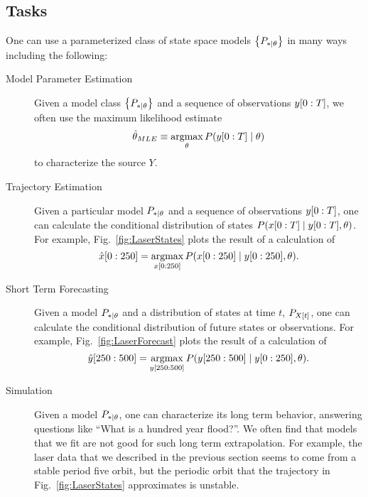 \subsection{Tasks}
\label{sec:tasks}

One can use a parameterized class of state space models $\left\{
  P_{*\mid \theta} \right\}$ in many ways including the following:
\begin{description}
\item[Model Parameter Estimation] Given a model class $\left\{
    P_{*\mid \theta} \right\}$ and a sequence of observations $y[0:T]$,
  we often use the maximum likelihood estimate
  \begin{equation}
    \label{eq:IntroMLE}
    \hat \theta_{MLE} \equiv \operatorname*{argmax}_{\theta} P(y[0:T]\mid \theta)
  \end{equation}
  to characterize the source  $Y$.
\item[Trajectory Estimation] Given a particular model $P_{*\mid \theta}$ and
  a sequence of observations $y[0:T]$, one can calculate the
  conditional distribution of states
  $P(x[0:T]\mid y[0:T],\theta)$.  For example,
  Fig.~\ref{fig:LaserStates} plots the result of a calculation of
  \begin{equation*}
    \hat x[0:250] = \operatorname*{argmax}_{x[0:250]}
    P(x[0:250]\mid y[0:250],\theta).    
  \end{equation*}
\item[Short Term Forecasting] Given a model $P_{*\mid \theta}$ and a
  distribution of states at time $t$, $P_{{X}{[t]}}$, one can
  calculate the conditional distribution of future states or
  observations.  For example, Fig.~\ref{fig:LaserForecast} plots the
  result of a calculation of
  \begin{equation*}
    \hat y[250:500] = \operatorname*{argmax}_{y[250:500]}
    P(y[250:500]\mid y[0:250],\theta).
  \end{equation*}
\item[Simulation] Given a model $P_{*\mid \theta}$, one can
  characterize its long term behavior, answering questions like ``What
  is a hundred year flood?''.    We often find that models that we fit
  are not good for such long term extrapolation.  For example, the
  laser data that we described in the previous section seems to come
  from a stable period five orbit, but the periodic orbit that the
  trajectory in Fig.~\ref{fig:LaserStates} approximates is unstable.

\end{description}
